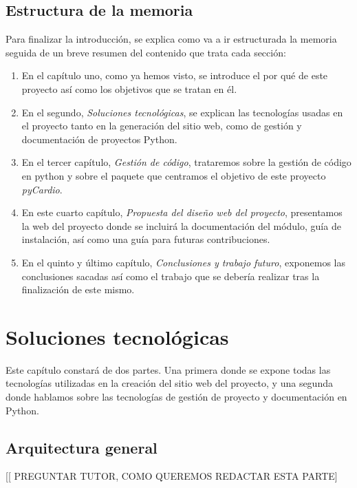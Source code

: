 \documentclass[a4paper, 12pt]{book}
\begin{document}
\section{Estructura de la memoria}
\label{sec:estruc}
Para finalizar la introducción, se explica como va a ir estructurada la memoria seguida de un breve resumen del contenido que trata cada sección: 
\begin{enumerate}
    \item En el capítulo uno, como ya hemos visto, se introduce el por qué de este proyecto así como los objetivos que se tratan en él.
    \item En el segundo, \emph{Soluciones tecnológicas}, se explican las tecnologías usadas en el proyecto tanto en la generación del sitio web, como de gestión y documentación de proyectos Python.
    \item En el tercer capítulo, \emph{Gestión de código}, trataremos sobre la gestión de código en python y sobre el paquete que centramos el objetivo de este proyecto \emph{pyCardio}.
    \item En este cuarto capítulo, \emph{Propuesta del diseño web del proyecto}, presentamos la web del proyecto donde se incluirá la documentación del módulo, guía de instalación, así como una guía para futuras contribuciones.
    \item En el quinto y último capítulo, \emph{Conclusiones y trabajo futuro}, exponemos las conclusiones sacadas así como el trabajo que se debería realizar tras la finalización de este mismo.
\end{enumerate}

\chapter{Soluciones tecnológicas}
\label{chap:Arqui}
Este capítulo constará de dos partes. Una primera donde se expone todas las tecnologías utilizadas en la creación del sitio web del proyecto, y una segunda donde hablamos sobre las tecnologías de gestión de proyecto y documentación en Python.


\section{Arquitectura general}
\label{sec:arqui}
[[  PREGUNTAR TUTOR, COMO QUEREMOS REDACTAR ESTA PARTE]
\end{document}
